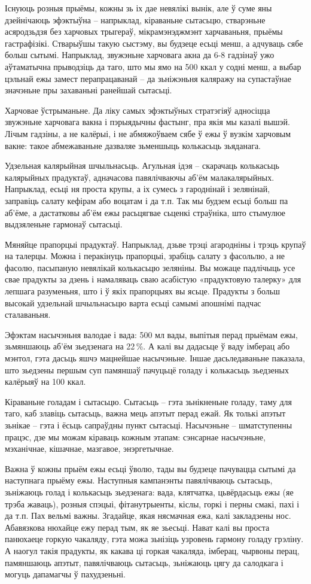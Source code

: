 Існуюць розныя прыёмы, кожны зь іх дае невялікі вынік, але ў суме яны дзейнічаюць эфэктыўна – напрыклад, кіраваньне сытасьцю, стварэньне асяродзьдзя без харчовых трыгераў, мікрамэнэджмэнт харчаваньня, прыёмы гастрафізікі. Стварыўшы такую сыстэму, вы будзеце есьці менш, а адчуваць сябе больш сытымі. Напрыклад, звужэньне харчовага акна да 6-8 гадзінаў ужо аўтаматычна прыводзіць да таго, што мы ямо на 500 ккал у содні менш, а выбар цэльнай ежы замест перапрацаванай – да зьніжэньня каляражу на супастаўнае значэньне пры захаваньні ранейшай сытасьці.

Харчовае ўстрыманьне. Да ліку самых эфэктыўных стратэгіяў адносіцца звужэньне харчовага вакна і пэрыядычны фастынг, пра якія мы казалі вышэй. Лічым гадзіны, а не калёрыі, і не абмяжоўваем сябе ў ежы ў вузкім харчовым вакне: такое абмежаваньне дазваляе зьменшыць колькасьць зьяданага.

Удзельная калярыйная шчыльнасьць. Агульная ідэя – скарачаць колькасьць калярыйных прадуктаў, адначасова павялічваючы аб'ём малакалярыйных. Напрыклад, есьці ня проста крупы, а іх сумесь з гароднінай і зелянінай, заправіць салату кефірам або воцатам і да т.п. Так мы будзем есьці больш па аб'ёме, а дастатковы аб'ём ежы расьцягвае сьценкі страўніка, што стымулюе выдзяленьне гармонаў сытасьці.

Мяняйце прапорцыі прадуктаў. Напрыклад, дзьве трэці агародніны і трэць крупаў на талерцы. Можна і перакінуць прапорцыі, зрабіць салату з фасольлю, а не фасолю, пасыпаную невялікай колькасьцю зеляніны. Вы можаце падлічыць усе свае прадукты за дзень і намаляваць сваю асабістую «прадуктовую талерку» для лепшага разуменьня, што і ў якіх прапорцыях вы ясьце. Прадукты з больш высокай удзельнай шчыльнасьцю варта есьці самымі апошнімі падчас сталаваньня.

Эфэктам насычэньня валодае і вада: 500 мл вады, выпітыя перад прыёмам ежы, зьмяншаюць аб'ём зьедзенага на 22\,\%. А калі вы дадасьце ў ваду імберац або мэнтол, гэта дасьць яшчэ мацнейшае насычэньне. Іншае дасьледаваньне паказала, што зьедзены першым суп памяншаў пачуцьцё голаду і колькасьць зьедзеных калёрыяў на 100 ккал.

Кіраваньне голадам і сытасьцю. Сытасьць – гэта зьнікненьне голаду, таму для таго, каб злавіць сытасьць, важна мець апэтыт перад ежай. Як толькі апэтыт зьнікае – гэта і ёсьць сапраўдны пункт сытасьці. Насычэньне – шматступенны працэс, дзе мы можам кіраваць кожным этапам: сэнсарнае насычэньне, мэханічнае, кішачнае, мазгавое, энэргетычнае.

Важна ў кожны прыём ежы есьці ўволю, тады вы будзеце пачувацца сытымі да наступнага прыёму ежы. Наступныя кампанэнты павялічваюць сытасьць, зьніжаюць голад і колькасьць зьедзенага: вада, клятчатка, цьвёрдасьць ежы (яе трэба жаваць), розныя спэцыі, фітанутрыенты, кіслы, горкі і перны смакі, пахі і да т.п. Пах вельмі важны. Згадайце, якая нясмачная ежа, калі закладзены нос. Абавязкова нюхайце ежу перад тым, як яе зьесьці. Нават калі вы проста панюхаеце горкую чакаляду, гэта можа зьнізіць узровень гармону голаду грэліну. А наогул такія прадукты, як какава ці горкая чакаляда, імберац, чырвоны перац, памяншаюць апэтыт, павялічваюць сытасьць, зьніжаюць цягу да салодкага і могуць дапамагчы ў пахудзеньні.

